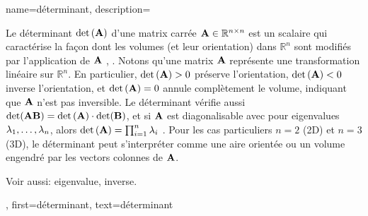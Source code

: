 {
	name={déterminant},
	description={
		Le déterminant $\det\,({\bf A})$ d'une \gls{matrix} carrée 
		${\bf A} \in \mathbb{R}^{n \times n}$ est un scalaire qui caractérise la façon dont les volumes (et leur orientation) dans $\mathbb{R}^n$ sont modifiés par l’application de ${\bf A}$ \cite{GolubVanLoanBook}, \cite{Strang2007}. 
		Notons qu’une \gls{matrix} ${\bf A}$ représente une transformation linéaire sur $\mathbb{R}^{n}$. 
		En particulier, $\det\,({\bf A}) > 0$ préserve l’orientation, $\det\,({\bf A}) < 0$ inverse l’orientation, 
		et $\det\,({\bf A}) = 0$ annule complètement le volume, indiquant que ${\bf A}$ n’est pas inversible. 
		Le déterminant vérifie aussi $\det({\bf A} {\bf B}) = \det\,({\bf A}) \cdot \det({\bf B})$, et si ${\bf A}$ est 
		diagonalisable avec pour \glspl{eigenvalue} $\lambda_{1}, \ldots, \lambda_{n}$, alors $\det\,({\bf A}) = \prod_{i=1}^{n} \lambda_{i}$ \cite{HornMatAnalysis}.
		Pour les cas particuliers $n=2$ (2D) et $n=3$ (3D), le déterminant peut s’interpréter comme une aire orientée ou un volume engendré par les \glspl{vector} colonnes de ${\bf A}$.
		\begin{figure}[H]
			\begin{center}
			\end{center}
		\end{figure}
		Voir aussi: \gls{eigenvalue}, \gls{inverse}.
	},
	first={déterminant},
	text={déterminant}
}

